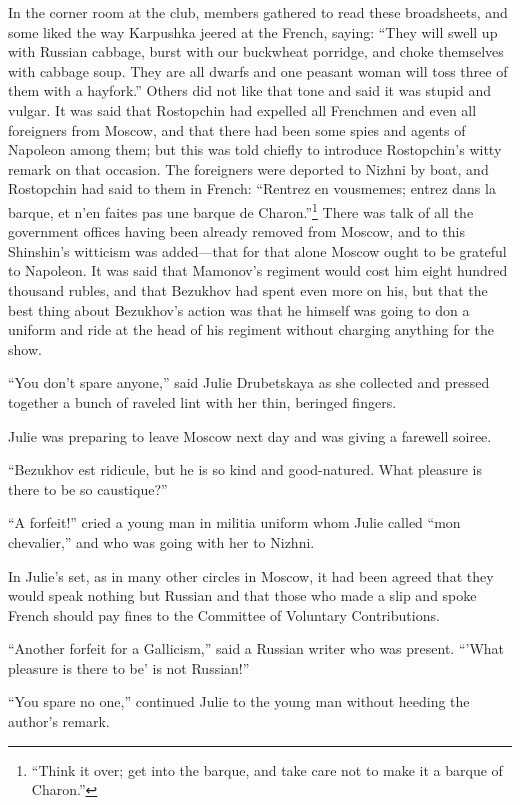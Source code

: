 In the corner room at the club, members gathered to read these
broadsheets, and some liked the way Karpushka jeered at the
French, saying: ``They will swell up with Russian cabbage, burst
with our buckwheat porridge, and choke themselves with cabbage
soup. They are all dwarfs and one peasant woman will toss three
of them with a hayfork.''  Others did not like that tone and said
it was stupid and vulgar. It was said that Rostopchin had
expelled all Frenchmen and even all foreigners from Moscow, and
that there had been some spies and agents of Napoleon among them;
but this was told chiefly to introduce Rostopchin's witty remark
on that occasion. The foreigners were deported to Nizhni by boat,
and Rostopchin had said to them in French: ``Rentrez en
vousmemes; entrez dans la barque, et n'en faites pas une barque
de Charon.''\footnote{``Think it over; get into the barque, and
take care not to make it a barque of Charon.''} There was talk of
all the government offices having been already removed from
Moscow, and to this Shinshin's witticism was added---that for
that alone Moscow ought to be grateful to Napoleon. It was said
that Mamonov's regiment would cost him eight hundred thousand
rubles, and that Bezukhov had spent even more on his, but that
the best thing about Bezukhov's action was that he himself was
going to don a uniform and ride at the head of his regiment
without charging anything for the show.
 

``You don't spare anyone,'' said Julie Drubetskaya as she
collected and pressed together a bunch of raveled lint with her
thin, beringed fingers.

Julie was preparing to leave Moscow next day and was giving a
farewell soiree.

``Bezukhov est ridicule, but he is so kind and good-natured. What
pleasure is there to be so caustique?''

``A forfeit!'' cried a young man in militia uniform whom Julie
called ``mon chevalier,'' and who was going with her to Nizhni.

In Julie's set, as in many other circles in Moscow, it had been
agreed that they would speak nothing but Russian and that those
who made a slip and spoke French should pay fines to the
Committee of Voluntary Contributions.

``Another forfeit for a Gallicism,'' said a Russian writer who
was present. ``'What pleasure is there to be' is not Russian!''

``You spare no one,'' continued Julie to the young man without
heeding the author's remark.

